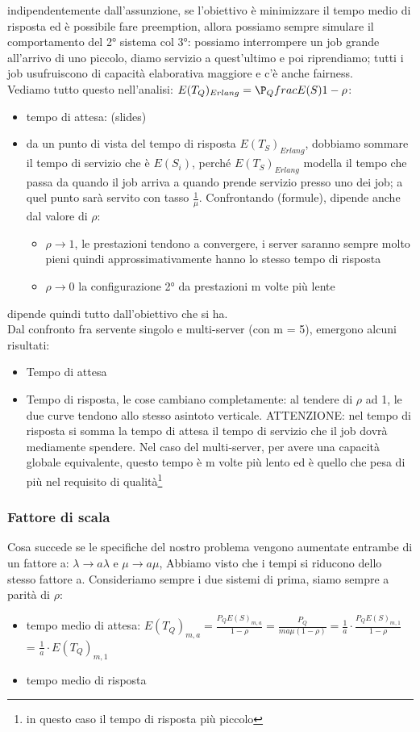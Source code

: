 \documentclass{article}
\begin{document}
indipendentemente dall'assunzione, se l'obiettivo è minimizzare il tempo medio di risposta ed è possibile fare preemption, allora possiamo sempre simulare il comportamento del 2° sistema col 3°: possiamo interrompere un job grande all'arrivo di uno piccolo, diamo servizio a quest'ultimo e poi riprendiamo; tutti i job usufruiscono di capacità elaborativa maggiore e c'è anche fairness.\\ Vediamo tutto questo nell'analisi: $E(T_Q)_{Erlang} = \P_Qfrac{E(S)}{1 - \rho}$:
\begin{itemize}
\item tempo di attesa: (slides)
\item da un punto di vista del tempo di risposta $E(T_S)_{Erlang}$, dobbiamo sommare il tempo di servizio che è $E(S_i)$, perché $E(T_S)_{Erlang}$ modella il tempo che passa da quando il job arriva a quando prende servizio presso uno dei job; a quel punto sarà servito con tasso $\frac{1}{\mu}$. Confrontando (formule), dipende anche dal valore di $\rho$:
\begin{itemize}
\item $\rho \longrightarrow 1$, le prestazioni tendono a convergere, i server saranno sempre molto pieni quindi approssimativamente hanno lo stesso tempo di risposta
\item $\rho \longrightarrow 0$ la configurazione 2° da prestazioni m volte più lente
\end{itemize}
\end{itemize}
dipende quindi tutto dall'obiettivo che si ha.\\ Dal confronto fra servente singolo e multi-server (con m = 5), emergono alcuni risultati:
\begin{itemize}
\item Tempo di attesa
\item Tempo di risposta, le cose cambiano completamente: al tendere di $\rho$ ad 1, le due curve tendono allo stesso asintoto verticale. ATTENZIONE: nel tempo di risposta si somma la tempo di attesa il tempo di servizio che il job dovrà mediamente spendere. Nel caso del multi-server, per avere una capacità globale equivalente, questo tempo è m volte più lento ed è quello che pesa di più nel requisito di qualità\footnote{in questo caso il tempo di risposta più piccolo} 
\end{itemize}
\subsubsection{Fattore di scala}
Cosa succede se le specifiche del nostro problema vengono aumentate entrambe di un fattore a: $\lambda \rightarrow a\lambda$ e $\mu \rightarrow a\mu$, Abbiamo visto che i tempi si riducono dello stesso fattore a. Consideriamo sempre i due sistemi di prima, siamo sempre a parità di $\rho$:
\begin{itemize}
\item tempo medio di attesa: $E(T_Q)_{m,a} = \frac{P_Q E(S)_{m,a}}{1 - \rho} = \frac{P_Q}{ma \mu (1 - \rho)} = \frac{1}{a}\cdot \frac{P_Q E(S)_{m,1}}{1 - \rho}$ = $\frac{1}{a}\cdot E(T_Q)_{m,1}$ 
\item tempo medio di risposta
\end{itemize}
\end{document}
